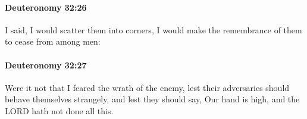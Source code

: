 		\paragraph{Deuteronomy 32:26} %
			\label{DEUTERONOMY-32-26}

			I said, I would scatter them into corners, I would make the remembrance of them to cease from among men:


		\paragraph{Deuteronomy 32:27} %
			\label{DEUTERONOMY-32-27}

			Were it not that I feared the wrath of the enemy, lest their adversaries should behave themselves strangely, and lest they should say, Our hand is high, and the LORD hath not done all this.


